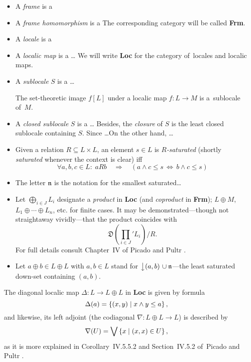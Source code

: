\begin{itemize}
\item A \emph{frame} is a
\item A \emph{frame homomorphism} is a
The corresponding category will be called {\bf Frm}.
\item A \emph{locale} is a
\item A \emph{localic map} is a \ldots
We will write {\bf Loc} for the category of~locales and localic maps.
\item A \emph{sublocale} $S$ is a \ldots
  \begin{fact}
    The set-theoretic image $f[L]$ under a localic map $f\colon L\to M$
    is a~sublocale of~$M$.
  \end{fact}
\item A \emph{closed sublocale} $S$ is a \ldots
Besides, the \emph{closure} of $S$ is the least closed sublocale containing $S$.
Since \ldots On the other hand, \ldots
\item Given a relation $R\subseteq L \times L$, an element $s\in L$ is
\emph{$R$-saturated} (shortly \emph{saturated} whenever the context is clear)
  iff
\[
  \forall a, b, c\in L: \; aRb \quad \Rightarrow \quad \left( a \wedge c \leq s
  \, \Leftrightarrow \, b \wedge c \leq s \right)
\]
\item The letter $\mathfrak{n}$ is the notation for the smallest saturated\ldots
\item Let $\bigoplus_{i\in J} L_i$ designate a \emph{product} in {\bf Loc} (and
\emph{coproduct} in {\bf Frm}); $L \oplus M$, $L_1 \oplus\cdots\oplus L_n$, etc.
for finite cases.
It may be demonstrated---though not straightaway vividly---that the product
coincides with
\[
  \textstyle\mathfrak{D}\left(\prod_{i\in J}\nolimits' L_{i}\right)/R.
\]
For full details consult Chapter~IV of Picado and Pultr \cite{picado-pultr12}.
\item Let $a \oplus b \in L \oplus L$ with $a, b\in L$ stand for
$\left\downarrow (a, b) \right. \cup \mathfrak{n}$---the least saturated down-set
containing $(a, b)$.
\end{itemize}

\begin{exmpl} \label{(co)diag-in-Loc}
  The diagonal localic map $\Delta\colon L \to L \oplus L$ in {\bf Loc} is
  given by formula
  \[
    \Delta(a) = \left\{ (x, y) \mid x \wedge y \leq a \right\},
  \]
  and likewise, its left adjoint (the codiagonal $\nabla\colon L \oplus L \to
  L$) is described by
  \[
    \nabla(U) = \bigvee \left\{ x \mid (x, x)\in U \right\},
  \]
  as it is more explained in Corollary~IV.5.5.2 and Section~IV.5.2 of~Picado
  and Pultr \cite{picado-pultr12}.
\end{exmpl}

